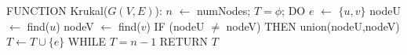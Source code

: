 FUNCTION Krukal($G(V,E)$):
  $n$ $\leftarrow$ numNodes;
  $T = \phi$;
  DO
     $e$ $\leftarrow$ $\{u,v\}$
     nodeU $\leftarrow$ find($u$)
     nodeV $\leftarrow$ find($v$)
     IF (nodeU $\neq$ nodeV) THEN
        union(nodeU,nodeV)
        $T \leftarrow T \cup \{e\}$
  WHILE $T = n - 1$
  RETURN $T$
